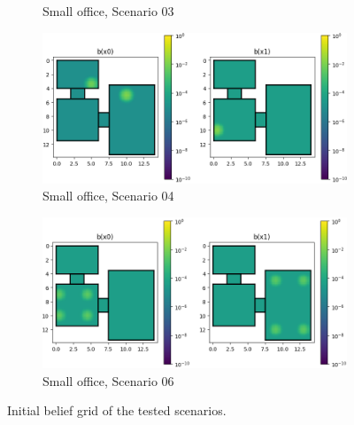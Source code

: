 \begin{figure}
\begin{subfigure}[b]{0.49\textwidth}
        \caption{Small office, Scenario 03}
        \label{subfig:sc03}
    \end{subfigure}
     \begin{subfigure}[b]{\textwidth}
        \includegraphics[width=\textwidth]{Report/images/scenarios/envsmall_sc04.png}
        \caption{Small office, Scenario 04}
        \label{subfig:sc04}
    \end{subfigure}
     \begin{subfigure}[b]{\textwidth}
        \includegraphics[width=\textwidth]{Report/images/scenarios/envsmall_sc06.png}
        \caption{Small office, Scenario 06}
        \label{subfig:sc06}
    \end{subfigure}
    \caption{Initial belief grid of the tested scenarios.}
    \label{fig:scenarios}
\end{figure}
%
